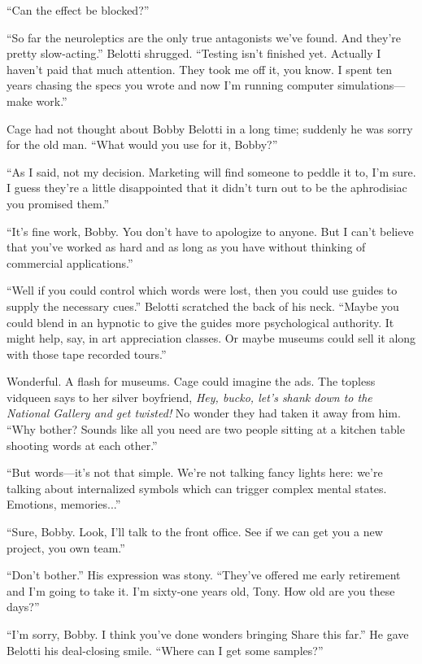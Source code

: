 ``Can the effect be blocked?''

``So far the neuroleptics are the only true antagonists we've found. And they're pretty slow-acting.'' Belotti shrugged. ``Testing isn't finished yet. Actually I haven't paid that much attention. They took me off it, you know. I spent ten years chasing the specs you wrote and now I'm running computer simulations---make work.''

Cage had not thought about Bobby Belotti in a long time; suddenly he was sorry for the old man. ``What would you use for it, Bobby?''

``As I said, not my decision. Marketing will find someone to peddle it to, I'm sure. I guess they're a little disappointed that it didn't turn out to be the aphrodisiac you promised them.''

``It's fine work, Bobby. You don't have to apologize to anyone. But I can't believe that you've worked as hard and as long as you have without thinking of commercial applications.''

``Well if you could control which words were lost, then you could use guides to supply the necessary cues.'' Belotti scratched the back of his neck. ``Maybe you could blend in an hypnotic to give the guides more psychological authority. It might help, say, in art appreciation classes. Or maybe museums could sell it along with those tape recorded tours.''

Wonderful. A flash for museums. Cage could imagine the ads. The topless vidqueen says to her silver boyfriend, \textit{Hey, bucko, let's shank down to the National Gallery and get twisted!} No wonder they had taken it away from him. ``Why bother? Sounds like all you need are two people sitting at a kitchen table shooting words at each other.''

``But words---it's not that simple. We're not talking fancy lights here: we're talking about internalized symbols which can trigger complex mental states. Emotions, memories...''

``Sure, Bobby. Look, I'll talk to the front office. See if we can get you a new project, you own team.''

``Don't bother.'' His expression was stony. ``They've offered me early retirement and I'm going to take it. I'm sixty-one years old, Tony. How old are you these days?''

``I'm sorry, Bobby. I think you've done wonders bringing Share this far.'' He gave Belotti his deal-closing smile. ``Where can I get some samples?''

